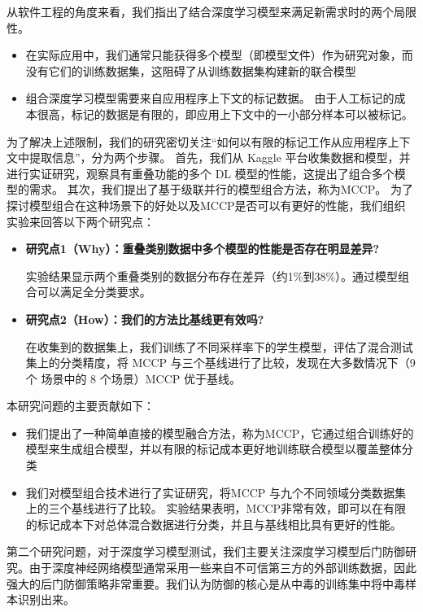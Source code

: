 \documentclass[fontset=macnew,UTF8]{article} %
\begin{document}
从软件工程的角度来看，我们指出了结合深度学习模型来满足新需求时的两个局限性。
\begin{itemize}
	\item 在实际应用中，我们通常只能获得多个模型（即模型文件）作为研究对象，而没有它们的训练数据集，这阻碍了从训练数据集构建新的联合模型
	 \item  组合深度学习模型需要来自应用程序上下文的标记数据。 由于人工标记的成本很高，标记的数据是有限的，即应用上下文中的一小部分样本可以被标记。
\end{itemize}

为了解决上述限制，我们的研究密切关注“如何以有限的标记工作从应用程序上下文中提取信息”，分为两个步骤。 首先，我们从 Kaggle 平台收集数据和模型，并进行实证研究，观察具有重叠功能的多个 DL 模型的性能，这提出了组合多个模型的需求。 其次，我们提出了基于级联并行的模型组合方法，称为MCCP。 为了探讨模型组合在这种场景下的好处以及MCCP是否可以有更好的性能，我们组织实验来回答以下两个研究点：

\begin{itemize}
	\item \textbf{研究点1（Why）：重叠类别数据中多个模型的性能是否存在明显差异?} 
	
	实验结果显示两个重叠类别的数据分布存在差异（约1\%到38\%）。通过模型组合可以满足全分类要求。
	
	\item  \textbf{研究点2（How）：我们的方法比基线更有效吗?} 
	
	在收集到的数据集上，我们训练了不同采样率下的学生模型，评估了混合测试集上的分类精度，将 MCCP 与三个基线进行了比较，发现在大多数情况下（9 个 场景中的 8 个场景）MCCP 优于基线。
\end{itemize}

本研究问题的主要贡献如下：

\begin{itemize}
	\item 我们提出了一种简单直接的模型融合方法，称为MCCP，它通过组合训练好的模型来生成组合模型，并以有限的标记成本更好地训练联合模型以覆盖整体分类
	\item  	我们对模型组合技术进行了实证研究，将MCCP 与九个不同领域分类数据集上的三个基线进行了比较。 实验结果表明，MCCP非常有效，即可以在有限的标记成本下对总体混合数据进行分类，并且与基线相比具有更好的性能。
\end{itemize}





第二个研究问题，对于深度学习模型测试，我们主要关注深度学习模型后门防御研究。由于深度神经网络模型通常采用一些来自不可信第三方的外部训练数据，因此强大的后门防御策略非常重要。我们认为防御的核心是从中毒的训练集中将中毒样本识别出来。
\end{document}
